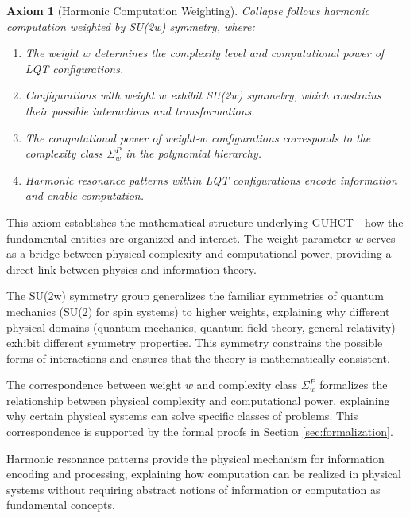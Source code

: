 \documentclass[11pt,a4paper]{article}
\makeatletter
\newtheorem{axiom}[theorem]{Axiom}
\renewenvironment{proof}[1][\proofname]{\par
  \pushQED{\qed}%
  \normalfont \topsep6\p@\@plus6\p@\relax
  \trivlist
  \item[\hskip\labelsep
        \itshape
    #1\@addpunct{.}]\ignorespaces
}{%
  \popQED\endtrivlist\@endpefalse
}
\makeatother
\begin{document}
\begin{axiom}[Harmonic Computation Weighting]
\label{axiom:harmonic_computation}
Collapse follows harmonic computation weighted by SU(2w) symmetry, where:
\begin{enumerate}
    \item The weight $w$ determines the complexity level and computational power of LQT configurations.
    \item Configurations with weight $w$ exhibit SU(2w) symmetry, which constrains their possible interactions and transformations.
    \item The computational power of weight-$w$ configurations corresponds to the complexity class $\Sigma_w^P$ in the polynomial hierarchy.
    \item Harmonic resonance patterns within LQT configurations encode information and enable computation.
\end{enumerate}
\end{axiom}

\begin{proof}[Justification]
This axiom establishes the mathematical structure underlying GUHCT—how the fundamental entities are organized and interact. The weight parameter $w$ serves as a bridge between physical complexity and computational power, providing a direct link between physics and information theory.

The SU(2w) symmetry group generalizes the familiar symmetries of quantum mechanics (SU(2) for spin systems) to higher weights, explaining why different physical domains (quantum mechanics, quantum field theory, general relativity) exhibit different symmetry properties. This symmetry constrains the possible forms of interactions and ensures that the theory is mathematically consistent.

The correspondence between weight $w$ and complexity class $\Sigma_w^P$ formalizes the relationship between physical complexity and computational power, explaining why certain physical systems can solve specific classes of problems. This correspondence is supported by the formal proofs in Section \ref{sec:formalization}.

Harmonic resonance patterns provide the physical mechanism for information encoding and processing, explaining how computation can be realized in physical systems without requiring abstract notions of information or computation as fundamental concepts.
\end{proof}
\end{document}

